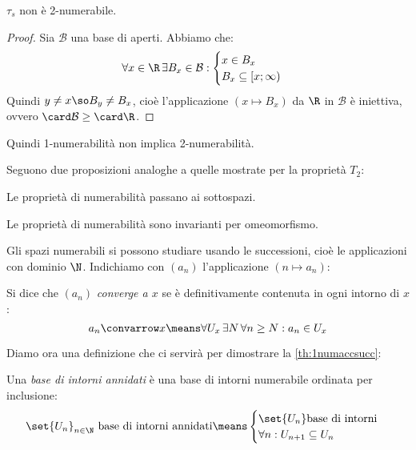 \begin{prop}
	$\tau_s$ non è 2-numerabile.
\end{prop}

\begin{proof}
	Sia $\mathcal B$ una base di aperti.
	Abbiamo che:
	\[\forall x\in\R\,\exists B_x\in\mathcal B:
	\begin{cases}
		x\in B_x\\
		B_x\subseteq [x;\infty)
	\end{cases}\]
	Quindi $y\neq x\so B_y\neq B_x$,
	cioè l'applicazione $(x\mapsto B_x)$ da $\R$ in $\mathcal B$ è iniettiva,
	ovvero $\card\mathcal B\geq\card\R$.
\end{proof}

\begin{oss}
	Quindi 1-numerabilità non implica 2-numerabilità.
\end{oss}

Seguono due proposizioni analoghe a quelle mostrate per la proprietà $T_2$:

\begin{prop}
	Le proprietà di numerabilità passano ai sottospazi.
\end{prop}

\begin{prop}
	Le proprietà di numerabilità sono invarianti per omeomorfismo.
\end{prop}

Gli spazi numerabili si possono studiare usando le successioni, cioè le applicazioni con dominio $\N$.
Indichiamo con $(a_n)$ l'applicazione $(n\mapsto a_n)$:

\begin{defn}[Convergenza]
	Si dice che $(a_n)$ \emph{converge a $x$} se è definitivamente contenuta in ogni intorno di $x$:
	\[a_n\convarrow x\means
	\forall U_x\,\exists N\,\forall n\geq N:a_n\in U_x\]
\end{defn}

Diamo ora una definizione che ci servirà per dimostrare la \autoref{th:1numaccsucc}:

\begin{defn}
	Una \emph{base di intorni annidati} è una base di intorni numerabile ordinata per inclusione:
	\[\set{U_n}_{n\in\N}\text{ base di intorni annidati}\means
	\begin{cases}
		\set{U_n}\text{base di intorni}\\
		\forall n:U_{n+1}\subseteq U_n
	\end{cases}\]
\end{defn}

